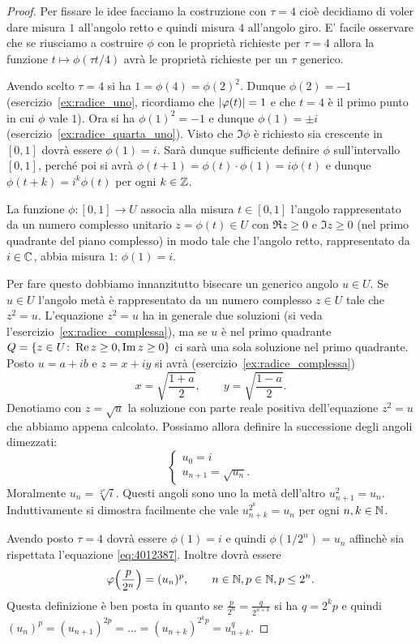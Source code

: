 \begin{proof}
Per fissare le idee facciamo la costruzione con $\tau=4$ 
cioè decidiamo di voler dare misura $1$ all'angolo retto e 
quindi misura $4$ all'angolo 
giro. 
E' facile osservare che se riusciamo a costruire $\phi$ con le proprietà 
richieste per $\tau=4$ allora la funzione $t\mapsto \phi(\tau t / 4)$ 
avrà le proprietà richieste per un $\tau$ generico.

Avendo scelto $\tau=4$ si ha $1 = \phi(4) = \phi(2)^2$. 
Dunque $\phi(2)=-1$ (esercizio~\ref{ex:radice_uno}, 
ricordiamo che ${\left|\varphi(t)\right|}=1$ e che $t=4$ 
è il primo punto in cui $\phi$ vale $1$).
Ora si ha $\phi(1)^2=-1$ e dunque $\phi(1)=\pm i$ (esercizio~\ref{ex:radice_quarta_uno}).
Visto che $\Im \phi$ è richiesto sia crescente in $[0,1]$ dovrà essere
$\phi(1)=i$. 
Sarà dunque sufficiente definire $\phi$ sull'intervallo $[0,1]$, 
perché poi si avrà $\phi(t+1)=\phi(t)\cdot \phi(1) = i\phi(t)$
e dunque $\phi(t+k)=i^k\phi(t)$ per ogni $k\in {\mathbb Z}$.

La funzione $\phi\colon[0,1]\to U$
associa alla misura $t\in[0,1]$ l'angolo rappresentato da 
un numero complesso unitario $z=\phi(t)\in U$ con $\Re z\ge 0$ e $\Im z\ge 0$
(nel primo quadrante del piano complesso) in modo tale 
che l'angolo retto, rappresentato da $i\in {\mathbb C}$, abbia misura $1$: $\phi(1)=i$.

Per fare questo dobbiamo innanzitutto bisecare un generico angolo 
$u\in U$.
Se $u\in U$ l'angolo metà è rappresentato da un numero 
complesso $z\in U$ tale che $z^2=u$. 
L'equazione $z^2=u$ ha in generale due soluzioni (si veda l'esercizio~\ref{ex:radice_complessa}), 
ma se $u$ 
è nel primo quadrante $Q={\left\{ z\in U\colon \operatorname{Re} z\ge 0, \operatorname{Im} z\ge 0 \right\}}$
ci sarà una sola soluzione nel primo quadrante.
Posto $u=a+ib$ e $z=x+iy$ si avrà (esercizio~\ref{ex:radice_complessa})
\[
  x = \sqrt{\frac{1+a}{2}}, \qquad 
  y = \sqrt{\frac{1-a}{2}}.
\]
Denotiamo con $z=\sqrt u$ la soluzione con parte reale positiva 
dell'equazione $z^2=u$ che abbiamo appena calcolato.
Possiamo allora definire la successione degli angoli dimezzati:
\[
\begin{cases}
u_0 = i\\
u_{n+1} = \sqrt{u_n}.
\end{cases}
\]
Moralmente $u_n = \sqrt[2^n] i$.
Questi angoli sono uno la metà dell'altro $u_{n+1}^2 = u_n$.
Induttivamente si dimostra facilmente che vale $u_{n+k}^{2^k} = u_n$
per ogni $n,k\in {\mathbb N}$.

Avendo posto $\tau=4$ dovrà essere $\phi(1)=i$ e quindi 
$\phi(1/2^n)=u_n$ affinchè sia rispettata l'equazione \eqref{eq:4012387}.
Inoltre dovrà essere
\begin{equation}
\varphi{\left( \frac{p}{2^n} \right)} = (u_n)^p,
\qquad n\in {\mathbb N}, p\in {\mathbb N}, p\le 2^n.
\end{equation}
Questa definizione è ben posta in quanto se $\frac{p}{2^n}=\frac{q}{2^{n+k}}$
si ha $q=2^k p$ e quindi 
$(u_n)^p = (u_{n+1})^{2p} = \dots = (u_{n+k})^{2^k p} = 
u_{n+k}^q$.


\end{proof}
